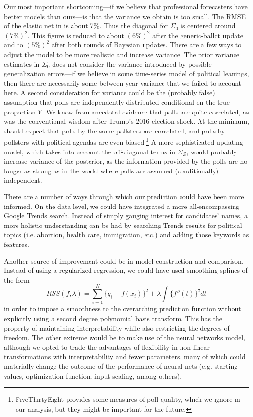 \documentclass[12pt, letterpaper]{article}
\begin{document}
Our most important shortcoming---if we believe that professional forecasters have better models than ours---is that the variance we obtain is too small. The RMSE of the elastic net in  is about 7\%. Thus the diagonal for $\Sigma_0$ is centered around $(7\%)^2$. This figure is reduced to about $(6\%)^2$ after the generic-ballot update and to $(5\%)^2$ after both rounds of Bayesian updates. There are a few ways to adjust the model to be more realistic and increase variance. The prior variance estimates in $\Sigma_0$ does not consider the variance introduced by possible generalization errors---if we believe in some time-series model of political leanings, then there are necessarily some between-year variance that we failed to account here. A second consideration for variance could be the (probably false) assumption that polls are independently distributed conditional on the true proportion $Y$. We know from anecdotal evidence that polls are quite correlated, as was the conventional wisdom after Trump's 2016 election shock. At the minimum, should expect that polls by the same pollsters are correlated, and polls by pollsters with political agendas are even biased.\footnote{FiveThirtyEight provides some measures of poll quality, which we ignore in our analysis, but they might be important for the future.} A  
more sophisticated updating model, which takes into account the off-diagonal terms in $\Sigma_Z$, would probably increase variance of the posterior, as the information provided by the polls are no longer as strong as in the world where polls are assumed (conditionally) independent.

There are a number of ways through which our prediction could have been more informed. On the data level, we could have integrated a more all-encompassing Google Trends search. Instead of simply gauging interest for candidates' names, a more holistic understanding can be had by searching Trends results for political topics (i.e. abortion, health care, immigration, etc.) and adding those keywords as features.

Another source of improvement could be in model construction and comparison. Instead of using a regularized regression, we could have used smoothing splines of the form $$RSS(f, \lambda) = \sum_{i=1}^{N}\{y_i - f(x_i)\}^2 + \lambda \int \{f''(t)\}^2dt$$ in order to impose a smoothness to the overarching prediction function without explicitly using a second degree polynomial basis transform. This has the property of maintaining interpretability while also restricting the degrees of freedom. The other extreme would be to make use of the neural networks model, although we opted to trade the advantages of flexibility in non-linear transformations with interpretability and fewer parameters, many of which could materially change the outcome of the performance of neural nets (e.g. starting values, optimization function, input scaling, among others).
\end{document}
